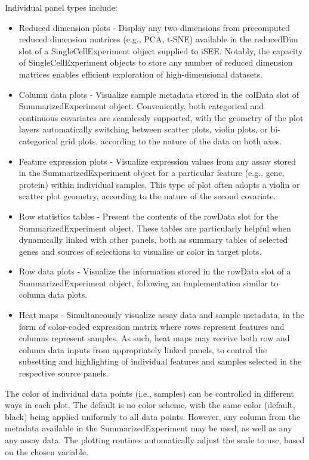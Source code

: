 \documentclass[10pt,a4paper,twocolumn]{article}
\begin{document}
Individual panel types include:

\begin{itemize}
\item Reduced dimension plots -  Display any two dimensions from precomputed reduced dimension matrices (e.g., PCA, t-SNE) available in the reducedDim slot of a SingleCellExperiment object supplied to iSEE. Notably, the capacity of SingleCellExperiment objects to store any number of reduced dimension matrices enables efficient exploration of high-dimensional datasets.
\item Column data plots - Visualize sample metadata stored in the colData slot of SummarizedExperiment object. Conveniently, both categorical and continuous covariates are seamlessly supported, with the geometry of the plot layers automatically switching between scatter plots, violin plots, or bi-categorical grid plots, according to the nature of the data on both axes.
\item Feature expression plots - Visualize expression values from any assay stored in the SummarizedExperiment object for a particular feature (e.g., gene, protein) within individual samples.
This type of plot often adopts a violin or scatter plot geometry, according to the nature of the second covariate.
\item Row statistics tables - Present the contents of the rowData slot for the SummarizedExperiment object.
These tables are particularly helpful when dynamically linked with other panels, both as summary tables of selected genes and sources of selections to visualise or color in target plots.
\item Row data plots - Visualize the information stored in the rowData slot of a SummarizedExperiment object, following an implementation similar to column data plots.
\item Heat maps - Simultaneously visualize assay data and sample metadata, in the form of color-coded expression matrix where rows represent features and columns represent samples.
As such, heat maps may receive both row and column data inputs from appropriately linked panels, to control the subsetting and highlighting of individual features and samples selected in the respective source panels.
\end{itemize}

The color of individual data points (i.e., samples) can be controlled in different ways in each plot. The default is no color scheme, with the same color (default, black) being applied uniformly to all data points.
However, any column from the metadata available in the SummarizedExperiment may be used, as well as any any assay data. The plotting routines automatically adjust the scale to use, based on the chosen variable.
\end{document}
